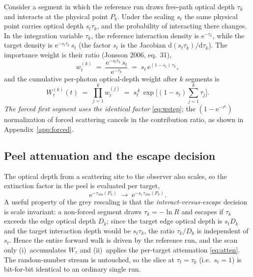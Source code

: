 \documentclass[english,a4paper]{kiseon_memo}
\newcommand{\rd}{\mathrm{d}}
\newcommand{\ee}{\mathrm{e}}
\newcommand{\obs}{\mathrm{obs}}
\newcommand{\edg}{\mathrm{e}}
\begin{document}
Consider a segment in which the reference run draws free-path optical depth
$\tau_k$ and interacts at the physical point $P_k$.  Under the scaling $s_t$ the
same physical point carries optical depth $s_t\tau_k$, and the probability of
interacting there changes.  In the integration variable $\tau_k$, the reference
interaction density is $\ee^{-\tau_k}$, while the target density is
$\ee^{-s_t\tau_k}\,s_t$ (the factor $s_t$ is the Jacobian
$\rd(s_t\tau_k)/\rd\tau_k$).  The importance weight is their ratio
(Jonsson 2006, eq.~31),
\begin{equation}
  w_t^{(k)} \;=\;
  \frac{\ee^{-s_t\tau_k}\,s_t}{\ee^{-\tau_k}}
  \;=\; s_t\,\ee^{(1-s_t)\,\tau_k} ,
  \label{eq:wstep}
\end{equation}
and the cumulative per-photon optical-depth weight after $k$ segments is
\begin{equation}
  W_\tau^{(k)}(t) \;=\; \prod_{j=1}^{k} w_t^{(j)}
  \;=\; s_t^{\,k}\,\exp\!\Big[(1-s_t)\textstyle\sum_{j=1}^{k}\tau_j\Big] .
  \label{eq:Wtau}
\end{equation}
\emph{The forced first segment uses the identical factor} \eqref{eq:wstep}; the
$(1-\ee^{-\tau^{\edg}})$ normalization of forced scattering cancels in the
contribution ratio, as shown in Appendix~\ref{app:forced}.

\subsection{Peel attenuation and the escape decision}

The optical depth from a scattering site to the observer also scales, so the
extinction factor in the peel is evaluated per target,
\begin{equation}
  \ee^{-\tau_\obs(P_k)} \;\longrightarrow\; \ee^{-s_t\,\tau_\obs(P_k)} .
  \label{eq:atten}
\end{equation}
A useful property of the grey rescaling is that the \emph{interact-versus-escape}
decision is scale invariant: a non-forced segment draws $\tau_k=-\ln R$ and
escapes if $\tau_k$ exceeds the edge optical depth $D_k$; since the target edge
optical depth is $s_t D_k$ and the target interaction depth would be $s_t\tau_k$,
the ratio $\tau_k/D_k$ is independent of $s_t$.  Hence the entire forward walk is
driven by the reference run, and the scan only (i)~accumulates $W_\tau$ and
(ii)~applies the per-target attenuation \eqref{eq:atten}.  The random-number
stream is untouched, so the slice at $\tau_t=\tau_0$ (i.e.\ $s_t=1$) is
bit-for-bit identical to an ordinary single run.
\end{document}
